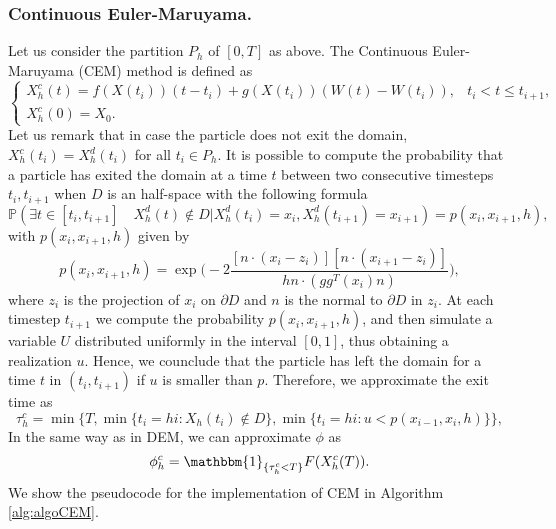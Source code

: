 \subsubsection{Continuous Euler-Maruyama. }
Let us consider the partition $P_h$ of $[0,T]$ as above. The Continuous Euler-Maruyama (CEM) method is defined as
\begin{equation}\label{eq:CEM}
	\begin{cases}
		X_h^c(t) = f(X(t_i))(t-t_i) + g(X(t_i))(W(t) - W(t_{i})),  & t_i < t \leq t_{i+1},\\
		X_h^c(0) = X_0.
	\end{cases}
\end{equation} 
Let us remark that in case the particle does not exit the domain, $X_h^c(t_i) = X_h^d(t_i)$ for all $t_i \in P_h$. It is possible to compute the probability that a particle has exited the domain at a time $t$ between two consecutive timesteps $t_i,t_{i+1}$ when $D$ is an half-space with the following formula \cite{Gobet2001}
\begin{equation}\label{eq:CEMProb}
	\mathbb{P} (\exists t \in [ t_i,t_{i+1} ] \quad X_h^d(t) \notin D | X_h^d(t_i) = x_i, X_h^d(t_{i+1}) = x_{i+1}) = p(x_i,x_{i+1},h),
\end{equation}
with $p(x_i,x_{i+1},h)$ given by
\begin{equation}\label{eq:CEMProbHalfSpace}
	p(x_i,x_{i+1},h) = \exp\Big(-2\frac{[n\cdot(x_i - z_i)][n\cdot(x_{i+1} - z_i)]}{hn\cdot (gg^T(x_i)n)}\Big),
\end{equation}
where $z_i$ is the projection of $x_i$ on $\partial D$ and $n$ is the normal to $\partial D$ in $z_i$. At each timestep $t_{i+1}$ we compute the probability $p(x_i,x_{i+1},h)$, and then simulate a variable $U$ distributed uniformly in the interval $\left[0,1\right]$, thus obtaining a realization $u$. Hence, we counclude that the particle has left the domain for a time $t$ in $(t_i,t_{i+1})$ if $u$ is smaller than $p$. Therefore, we approximate the exit time as
\begin{equation}\label{eq:TauCEM}
	\tau_h^c = \min \{T,\min\{t_i = hi \colon X_h(t_i) \notin D\}, \min\{t_i = hi \colon u < p(x_{i-1},x_i,h) \}\},
\end{equation}
In the same way as in DEM, we can approximate $\phi$ as
\begin{equation}\label{eq:PhiCEM}
	\phi_h^c = \mathbbm{1}_{\{\tau_h^c < T\}}F(X_h^c(T)).
\end{equation}
We show the pseudocode for the implementation of CEM in Algorithm \ref{alg:algoCEM}.

